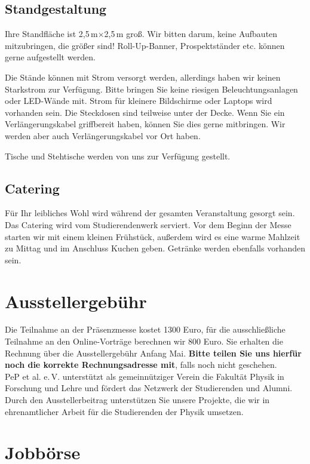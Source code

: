 \documentclass[
  paper=a4,
  fontsize=12pt,
  DIV=16,
  headheight=30pt,
  footheight=45pt,
  headinclude,
  parskip=half,
]{scrartcl}
\begin{document}
\subsection*{Standgestaltung}
Ihre Standfläche ist 2,5\,m$\times$2,5\,m groß.
Wir bitten darum, keine Aufbauten mitzubringen, die größer sind!
Roll-Up-Banner, Prospektständer etc. können gerne aufgestellt werden.

Die Stände können mit Strom versorgt werden, allerdings haben wir keinen Starkstrom zur Verfügung.
Bitte bringen Sie keine riesigen Beleuchtungsanlagen oder LED-Wände mit.
Strom für kleinere Bildschirme oder Laptops wird vorhanden sein.
Die Steckdosen sind teilweise unter der Decke.
Wenn Sie ein Verlängerungskabel griffbereit haben, können Sie dies gerne mitbringen.
Wir werden aber auch Verlängerungskabel vor Ort haben.

Tische und Stehtische werden von uns zur Verfügung gestellt.


\subsection*{Catering}
Für Ihr leibliches Wohl wird während der gesamten Veranstaltung gesorgt sein.
Das Catering wird vom Studierendenwerk serviert.
Vor dem Beginn der Messe starten wir mit einem kleinen Frühstück, außerdem wird es eine warme Mahlzeit zu Mittag und im Anschluss Kuchen geben.
Getränke werden ebenfalls vorhanden sein.


\section*{Ausstellergebühr}
Die Teilnahme an der Präsenzmesse kostet 1300 Euro, für die ausschließliche Teilnahme an den Online-Vorträge berechnen wir 800 Euro.
Sie erhalten die Rechnung über die Ausstellergebühr Anfang Mai.
\textbf{Bitte teilen Sie uns hierfür noch die korrekte Rechnungsadresse mit}, falls noch nicht geschehen.\\
PeP et al. e.\,V. unterstützt als gemeinnütziger Verein die Fakultät Physik in Forschung und Lehre und fördert das Netzwerk der Studierenden und Alumni.
Durch den Ausstellerbeitrag unterstützen Sie unsere Projekte, die wir in ehrenamtlicher Arbeit für die Studierenden der Physik umsetzen.

\section*{Jobbörse}
\end{document}
